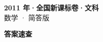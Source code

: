 \documentclass[zihao=-4, a4paper]{ctexart}
\begin{document}
\begin{center}
  {\Large\bfseries 2011 年·全国新课标卷·文科}\\[4pt]
  {\large 数学 · 简答版}
\end{center}
\medskip
{}

\clearpage
{}
\begin{center}{\Large\bfseries 答案速查}\end{center}
\medskip

\end{document}

